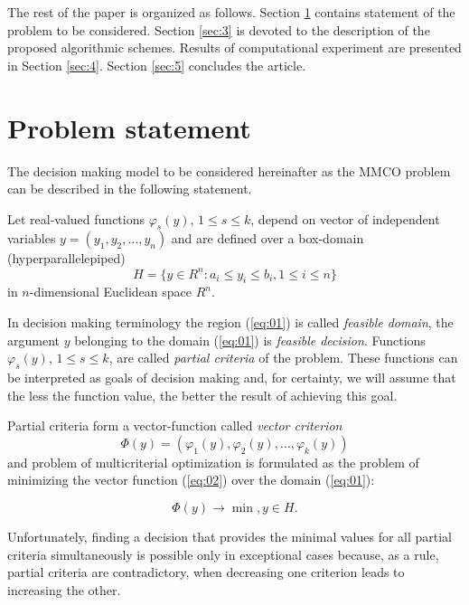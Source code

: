 \documentclass[runningheads]{llncs}
\begin{document}
The rest of the paper is organized as follows. Section \ref{sec:2} contains statement of the problem to be considered. Section \ref{sec:3} is devoted to the description of the proposed algorithmic schemes.  Results of computational experiment are presented in Section \ref{sec:4}. Section \ref{sec:5} concludes the article.

\section{Problem statement}\label{sec:2}

The decision making model to be considered hereinafter as the MMCO problem can be described in the following statement.

Let real-valued functions $\varphi_s(y)$, $1 \leq s \leq k$, depend on vector of independent variables 
$y=(y_1, y_2, \dots, y_n)$ and are defined over a box-domain (hyperparallelepiped)
\begin{equation}
\label{eq:01}
    H=\{y \in R^n : a_i \leq y_i \leq b_i, 1 \leq i \leq n\}
\end{equation}                                      in $n$-dimensional Euclidean space $R^n$.

In decision making terminology the region (\ref{eq:01}) is called \textit{feasible domain}, the argument $y$ belonging to the domain (\ref{eq:01}) is \textit{feasible decision}.  Functions  $\varphi_s(y)$, $1 \leq s \leq k$, are called \textit{partial criteria} of the problem. These functions can be interpreted as goals of decision making and, for certainty, we will assume that the less the function value, the better the result of achieving this goal.

Partial criteria form a vector-function called \textit{vector criterion}
\begin{equation}
\label{eq:02}
    \Phi(y) = (\varphi_1(y), \varphi_2(y), \dots, \varphi_k(y))
\end{equation}
and problem of multicriterial optimization is formulated as the problem of minimizing the vector function (\ref{eq:02}) over the domain (\ref{eq:01}):

\begin{equation}
\label{eq:03}
    \Phi(y) \to \min, y \in H.
\end{equation}

Unfortunately, finding a decision   that provides the minimal values for all partial criteria simultaneously is possible only in exceptional cases because, as a rule, partial criteria are contradictory, when decreasing one criterion leads to increasing the other.
\end{document}
